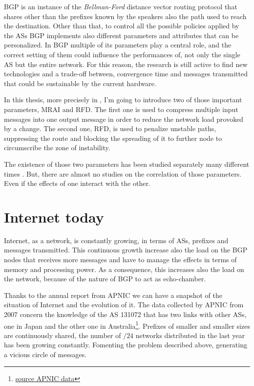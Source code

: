 \ac{BGP} is an instance of the \textit{Bellman-Ford} distance vector routing
protocol that shares other than the prefixes known by the speakers also the
path used to reach the destination.
Other than that, to control all the possible policies applied by the \acp{AS}
\ac{BGP} implements also different parameters and attributes that can be
personalized.
In \ac{BGP} multiple of its parameters play a central role, and the correct setting
of them could influence the performances of, not only the single \ac{AS} but
the entire network.
For this reason, the research is still active to find new technologies and
a trade-off between, convergence time and messages transmitted that could
be sustainable by the current hardware.

In this thesis, more precisely in , I'm going to introduce
two of those important parameters, \ac{MRAI} and \ac{RFD}.
The first one is used to compress multiple input messages into one
output message in order to reduce the network load provoked by a change.
The second one, \ac{RFD}, is used to penalize unstable paths, suppressing
the route and blocking the spreading of it to further node to circumscribe
the zone of instability.

The existence of those two parameters has been studied separately many different
times \cite{fabrikant2011there,daggitt2018rate,qiu2005optimal,gray2020bgp}.
But, there are almost no studies on the correlation of those parameters.
Even if the effects of one interact with the other.

\section{Internet today}
\label{sec:internet_today}

Internet, as a network, is constantly growing, in terms of \acp{AS}, prefixes
and messages transmitted.
This continuous growth increase also the load on the \ac{BGP} nodes that
receives more messages and have to manage the effects in terms of memory
and processing power.
As a consequence, this increases also the load on the network, because of the
nature of \ac{BGP} to act as echo-chamber.

Thanks to the annual report from \ac{APNIC} we can have a snapshot of
the situation of Internet and the evolution of it.
The data collected by \ac{APNIC} from \num{2007} concern the knowledge
of the \ac{AS} 131072 that has two links with other \acp{AS}, one in Japan and
the other one in Australia\footnote{\href{https://blog.apnic.net/2021/01/05/bgp-in-2020-the-bgp-table/}{source APNIC data}}.
Prefixes of smaller and smaller sizes are continuously shared, the number of
$/24$ networks distributed in the last year has been growing constantly.
Fomenting the problem described above, generating a vicious circle of messages.

